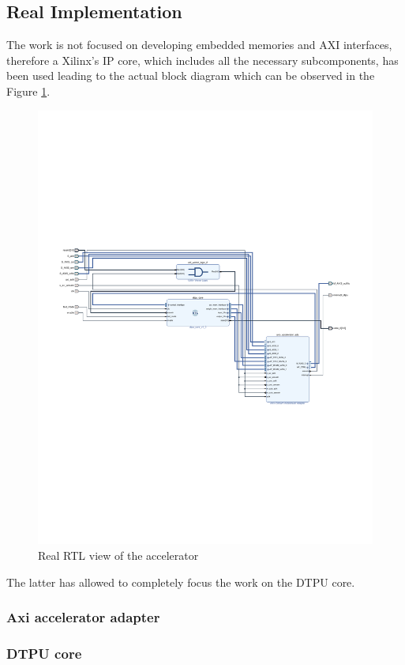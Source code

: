 \subsection{Real Implementation}
The work is not focused on developing embedded memories and AXI interfaces, therefore a Xilinx's IP core, which includes all the necessary subcomponents, has been used\cite{paper:43} leading to the actual block diagram which can be observed in the Figure \ref{fig:rtlaccel}.
\begin{figure}[H]
\centering
\captionsetup{justification=centering}
\includegraphics[scale=1,angle=90]{./figure/accelerator_schematic.pdf}
\caption{Real RTL view of the accelerator}
\label{fig:rtlaccel}
\end{figure} 
The latter has allowed to completely focus the work on the DTPU core.
\newpage
\subsubsection{Axi accelerator adapter}
\subsubsection{DTPU core}

